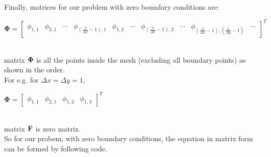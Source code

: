 \documentclass{article}
\begin{document}
Finally, matrices for our problem with zero boundary conditions are:\\
\centerline{$\mathbf{\Phi} = 
\begin{bmatrix}
    \phi_{1,1} & \phi_{2,1} & \cdots & \phi_{(\frac{3}{\Delta x}-1),1} & \phi_{1,2} &\cdots&\phi_{(\frac{3}{\Delta x}-1), 2} &\cdots & \phi_{(\frac{3}{\Delta x}-1), (\frac{2}{\Delta y}-1)} & \cdots
\end{bmatrix}^T$}\\
matrix $\bf{\Phi}$ is all the points inside the mesh (excluding all boundary points) as shown in the order.\\
For e.g. for $\Delta x = \Delta y = 1$,\\
\centerline{$\mathbf{\Phi} = 
\begin{bmatrix}
    \phi_{1,1} & \phi_{2,1} & \phi_{1,2} & \phi_{1,3}
\end{bmatrix}^T$}\\
matrix $\bf{F}$ is zero matrix.\\
So for our probem, with zero boundary conditions, the equation in matrix form can be formed by following code.\\
\end{document}
